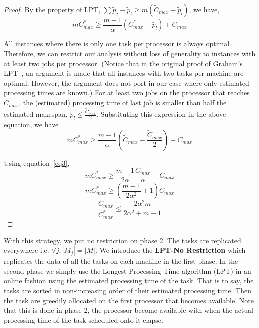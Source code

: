 \begin{proof}
 By the property of LPT, $\sum \tilde p_j-\tilde p_l \geq m (\tilde C_{max}-\tilde p_l)$, we have,
\begin{equation}\nonumber 
  m C_{max}^{*}\geq \frac{m-1}{\alpha } \left( \tilde{C_{max}} - \tilde{ p_l} \right) + {C_{max}}
 \end{equation}
 
 All instances where there is only one task per processor is always
 optimal. Therefore, we can restrict our analysis without loss of
 generality to instances with at least two jobs per processor. (Notice
 that in the original proof of Graham's LPT~\cite{Graham69boundson},
 an argument is made that all instances with two tasks per machine are
 optimal. However, the argument does not port in our case where only
 estimated processing times are known.) For at least two jobs on the
 processor that reaches $\tilde{C}_{max}$, the (estimated)
 processing time of last job is smaller than half the estimated
 makespan, $\tilde{p_l} \leq \frac{\tilde{C}_{max}}{2}$. Substituting
 this expression in the above equation, we have
\begin{equation}\nonumber
 m C_{max}^{*}\geq \frac{m-1}{\alpha } \left( \tilde C_{max}-\frac{\tilde C_{max}}{2} \right ) + {C_{max}}
\end{equation}

Using equation~\ref{eq3},
\begin{equation}\nonumber
 m C_{max}^{*}\geq \frac{m-1}{2\alpha } \frac{C_{max}} {\alpha} + {C_{max}}
\end{equation}
\begin{equation}\nonumber
 m C_{max}^{*}\geq \left( \frac{m-1}{2\alpha^{2} } +1\right){C_{max}}
\end{equation}
\begin{equation}\nonumber
\frac{C_{max}}{C_{max}^{*}}\leq \frac{2\alpha^{2}m}{2\alpha^{2}+ m-1}
\end{equation}
\end{proof} 

With this strategy, we put no restriction on phase 2. The tasks are
replicated everywhere i.e. $\forall j, |M_{j}|=|M|$. We introduce the
\textbf{LPT-No Restriction} which replicates the data of all the tasks
on each machine in the first phase. In the second phase we simply use
the Longest Processing Time algorithm (LPT) in an online fashion using
the estimated processing time of the task. That is to say, the tasks
are sorted in non-increasing order of their estimated processing
time. Then the task are greedily allocated on the first
processor that becomes available. Note that this is done in phase 2,
the processor become available with when the actual processing time of
the task scheduled onto it elapse.

